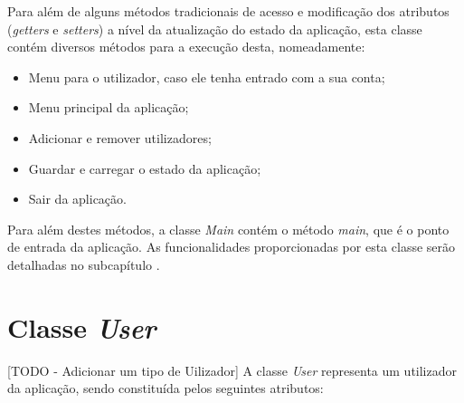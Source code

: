 \documentclass[a4paper,12pt]{scrreprt}
\begin{document}
    Para além de alguns métodos tradicionais de acesso e modificação dos atributos (\textit{getters} e \textit{setters}) a nível da atualização do estado da aplicação, esta classe contém diversos métodos para a execução desta, nomeadamente:
    \begin{itemize}
        \item Menu para o utilizador, caso ele tenha entrado com a sua conta;
        \item Menu principal da aplicação;
        \item Adicionar e remover utilizadores;
        \item Guardar e carregar o estado da aplicação;
        \item Sair da aplicação.
    \end{itemize}
    
    Para além destes métodos, a classe \textit{Main} contém o método \textit{main}, que é o ponto de entrada da aplicação.
    As funcionalidades proporcionadas por esta classe serão detalhadas no subcapítulo \textit{}.


\section{Classe \textit{User}}
    [TODO - Adicionar um tipo de Uilizador]
    A classe \textit{User} representa um utilizador da aplicação, sendo constituída pelos seguintes atributos:
\end{document}
